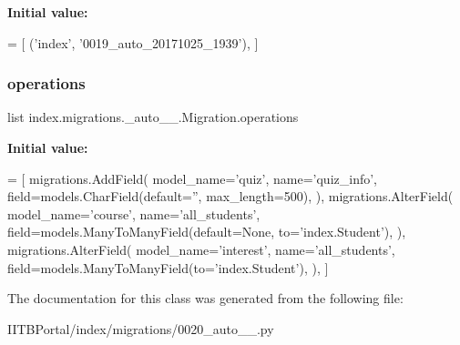 {\bfseries Initial value\+:}
\begin{DoxyCode}
=  [
        (\textcolor{stringliteral}{'index'}, \textcolor{stringliteral}{'0019\_auto\_20171025\_1939'}),
    ]
\end{DoxyCode}
\mbox{\label{classindex_1_1migrations_1_10020__auto__20171025__2032_1_1Migration_a9d5dc8f08beee14d41abd6e7b643eae3}} 
\subsubsection{\texorpdfstring{operations}{operations}}
{\footnotesize\ttfamily list index.\+migrations.\+\_\+auto\+\_\+\_.\+Migration.\+operations\hspace{0.3cm}{\ttfamily [static]}}

{\bfseries Initial value\+:}
\begin{DoxyCode}
=  [
        migrations.AddField(
            model\_name=\textcolor{stringliteral}{'quiz'},
            name=\textcolor{stringliteral}{'quiz\_info'},
            field=models.CharField(default=\textcolor{stringliteral}{''}, max\_length=500),
        ),
        migrations.AlterField(
            model\_name=\textcolor{stringliteral}{'course'},
            name=\textcolor{stringliteral}{'all\_students'},
            field=models.ManyToManyField(default=\textcolor{keywordtype}{None}, to=\textcolor{stringliteral}{'index.Student'}),
        ),
        migrations.AlterField(
            model\_name=\textcolor{stringliteral}{'interest'},
            name=\textcolor{stringliteral}{'all\_students'},
            field=models.ManyToManyField(to=\textcolor{stringliteral}{'index.Student'}),
        ),
    ]
\end{DoxyCode}


The documentation for this class was generated from the following file\+:\begin{DoxyCompactItemize}
\item 
I\+I\+T\+B\+Portal/index/migrations/0020\+\_\+auto\+\_\+\_.\+py\end{DoxyCompactItemize}
